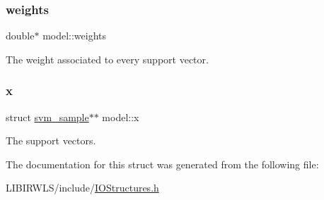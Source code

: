 \subsubsection{\texorpdfstring{weights}{weights}}
{\ttfamily double$\ast$ model\+::weights}

The weight associated to every support vector. \hypertarget{structmodel_a81da41c8731f95de344a068d302eb336}{}\label{structmodel_a81da41c8731f95de344a068d302eb336} 
\subsubsection{\texorpdfstring{x}{x}}
{\ttfamily struct \hyperlink{structsvm__sample}{svm\+\_\+sample}$\ast$$\ast$ model\+::x}

The support vectors. 

The documentation for this struct was generated from the following file\+:\begin{DoxyCompactItemize}
\item 
L\+I\+B\+I\+R\+W\+L\+S/include/\hyperlink{IOStructures_8h}{I\+O\+Structures.\+h}\end{DoxyCompactItemize}
